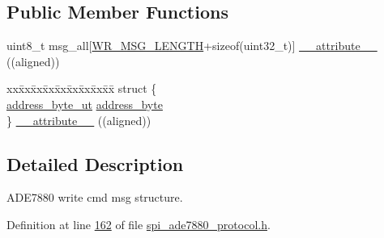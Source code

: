 \subsection*{Public Member Functions}
\begin{DoxyCompactItemize}
\item 
uint8\-\_\-t msg\-\_\-all\mbox{[}\hyperlink{a00041_ac85ecf34a5cbd85d6dbd51b4c9a5469e}{W\-R\-\_\-\-M\-S\-G\-\_\-\-L\-E\-N\-G\-T\-H}+sizeof(uint32\-\_\-t)\mbox{]} \hyperlink{a00020_a1649e1bd9e3b85107dbd32225b489e11}{\-\_\-\-\_\-attribute\-\_\-\-\_\-} ((aligned))
\item 
\begin{tabbing}
xx\=xx\=xx\=xx\=xx\=xx\=xx\=xx\=xx\=\kill
struct \{\\
\>\hyperlink{a00011}{address\_byte\_ut} \hyperlink{a00020_af6a65bac733ea3e9b1d24b065163d49a}{address\_byte}\\
\} \hyperlink{a00020_a95fb38952ec8fb6bb0147b738151d985}{\_\_attribute\_\_} ((aligned))\\

\end{tabbing}\end{DoxyCompactItemize}


\subsection{Detailed Description}
A\-D\-E7880 write cmd msg structure. 

Definition at line \hyperlink{a00041_source_l00162}{162} of file \hyperlink{a00041_source}{spi\-\_\-ade7880\-\_\-protocol.\-h}.



